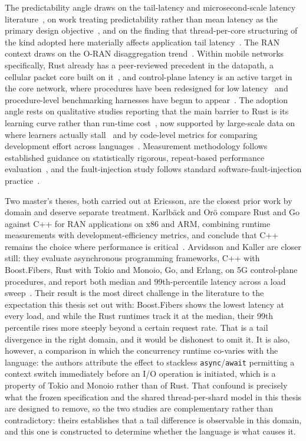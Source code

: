 \documentclass[english,twoside,openright,a4paper,censored,csm,software-track-2020]{HYthesisML}
\begin{document}
The predictability angle draws on the tail-latency and
microsecond-scale latency literature~\cite{dean2013tail,barroso2017microseconds,li2014tales},
on work treating predictability rather than mean latency as the primary design
objective~\cite{huang2017predictability}, and on the finding that thread-per-core structuring
of the kind adopted here materially affects application tail
latency~\cite{enberg2019threadpercore}. The RAN context draws on the O-RAN disaggregation
trend~\cite{polese2023oran}. Within mobile networks specifically, Rust already has a
peer-reviewed precedent in the datapath, a cellular packet core built on
it~\cite{qazi2017pepc}, and control-plane latency is an active target in the core network,
where procedures have been redesigned for low latency~\cite{liu2023l25gc} and procedure-level
benchmarking harnesses have begun to appear~\cite{park2025ctrlbench}. The adoption angle rests
on qualitative studies reporting that the main barrier to Rust is its learning curve rather
than run-time cost~\cite{fulton2021adopting}, now supported by large-scale data on where
learners actually stall~\cite{crichton2024learning} and by code-level metrics for comparing
development effort across languages~\cite{ardito2021verbosity}. Measurement methodology
follows established guidance on statistically rigorous, repeat-based performance
evaluation~\cite{georges2007rigorous}, and the fault-injection study follows standard
software-fault-injection practice~\cite{natella2016fault}.

Two master's theses, both carried out at Ericsson, are the closest prior work by domain and
deserve separate treatment. Karlb\"ack and Or\"o compare Rust and Go against C++ for RAN
applications on x86 and ARM, combining runtime measurements with development-efficiency metrics,
and conclude that C++ remains the choice where performance is
critical~\cite{karlback2021ran}. Arvidsson and Kaller are closer still: they evaluate
asynchronous programming frameworks, C++ with Boost.Fibers, Rust with Tokio and Monoio, Go, and
Erlang, on 5G control-plane procedures, and report both median and 99th-percentile latency
across a load sweep~\cite{arvidsson2025async}. Their result is the most direct challenge in the
literature to the expectation this thesis set out with: Boost.Fibers shows the lowest latency at
every load, and while the Rust runtimes track it at the median, their 99th percentile rises more
steeply beyond a certain request rate. That is a tail divergence in the right domain, and it
would be dishonest to omit it. It is also, however, a comparison in which the concurrency
runtime co-varies with the language: the authors attribute the effect to stackless
\texttt{async}/\texttt{await} permitting a context switch immediately before an I/O operation is
initiated, which is a property of Tokio and Monoio rather than of Rust. That confound is
precisely what the frozen specification and the shared thread-per-shard model in this thesis are
designed to remove, so the two studies are complementary rather than contradictory: theirs
establishes that a tail difference is observable in this domain, and this one is constructed to
determine whether the language is what causes it.
\end{document}
